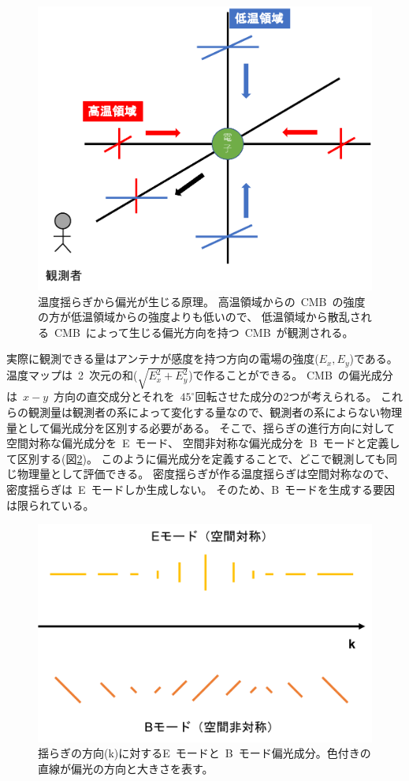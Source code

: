 \begin{figure}[htbp]
  \centering
  \includegraphics[width=0.8\columnwidth]{2_cosmology/figs/pol2.pdf}
  \caption{温度揺らぎから偏光が生じる原理。
  高温領域からの~CMB~の強度の方が低温領域からの強度よりも低いので、
  低温領域から散乱される~CMB~によって生じる偏光方向を持つ~CMB~が観測される。}
  \label{pol2}
\end{figure}


実際に観測できる量はアンテナが感度を持つ方向の電場の強度($E_x, E_y$)である。
温度マップは~2~次元の和($\sqrt{E_x^2 + E_y^2}$)で作ることができる。
CMB~の偏光成分は~$x-y$~方向の直交成分とそれを~$45^{\circ}$回転させた成分の2つが考えられる。
これらの観測量は観測者の系によって変化する量なので、観測者の系によらない物理量として偏光成分を区別する必要がある。
そこで、揺らぎの進行方向に対して空間対称な偏光成分を~E~モード、
空間非対称な偏光成分を~B~モードと定義して区別する(図\ref{ebmode1})。
このように偏光成分を定義することで、どこで観測しても同じ物理量として評価できる。
密度揺らぎが作る温度揺らぎは空間対称なので、密度揺らぎは~E~モードしか生成しない。
そのため、B~モードを生成する要因は限られている。

\begin{figure}[htbp]
  \centering
  \includegraphics[width=0.8\columnwidth]{2_cosmology/figs/ebmode1.pdf}
  \caption{揺らぎの方向(k)に対するE~モードと~B~モード偏光成分。色付きの直線が偏光の方向と大きさを表す。}
  \label{ebmode1}
\end{figure}

